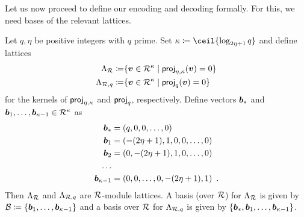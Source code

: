 \medskip
Let us now proceed to define our encoding and decoding formally. For this, we need bases of the relevant lattices.

\begin{proposition}\label{prop:kernellattices}
Let $q,\eta$ be positive integers with $q$ prime. Set $\limbs \coloneqq \ceil{ \log_{2\eta+1}q }$ and define lattices
\begin{align*}
\Lambda_{\mathcal{R}}    \coloneqq &\{\boldsymbol{v}\in\mathcal{R}^\kappa \mid \mathsf{proj}_{\eta,\kappa}(\boldsymbol{v}) = 0\}\\
\Lambda_{\mathcal{R},q} \coloneqq &\{\boldsymbol{v}\in\mathcal{R}^\kappa \mid \mathsf{proj}_{q}(\boldsymbol{v}) = 0\}\\
\end{align*}
for the kernels of $\mathsf{proj}_{\eta,\kappa}$ and $\mathsf{proj}_{q}$, respectively.
Define vectors $\boldsymbol{b}_{\ast}$ and $\boldsymbol{b}_1,\ldots,\boldsymbol{b}_{\kappa-1} \in \mathcal{R}^\kappa$ as
\begin{align*}
\boldsymbol{b}_{\ast} &= (q,0,0,\ldots, 0)\\
\boldsymbol{b}_1       &= (-(2\eta+1), 1, 0,0,\ldots, 0)\\
\boldsymbol{b}_2       &= (0, -(2\eta+1), 1, 0,\ldots, 0)\\
\ldots\\
\boldsymbol{b}_{\kappa-1}&=(0,0,\ldots,0, -(2\eta+1), 1)\enspace.
\end{align*}
Then $\Lambda_{\mathcal{R}}$ and $\Lambda_{\mathcal{R},q}$ are $\mathcal{R}$-module lattices. A basis (over $\mathcal{R}$) for $\Lambda_{\mathcal{R}}$ is given by $\mathcal{B} \coloneqq \{\boldsymbol{b}_1,\ldots,\boldsymbol{b}_{\kappa-1}\}$ and
a basis over $\mathcal{R}$ for $\Lambda_{\mathcal{R},q}$ is given by $\{\boldsymbol{b}_{\ast},\boldsymbol{b}_1,\ldots,\boldsymbol{b}_{\kappa-1}\}$.
\end{proposition}
